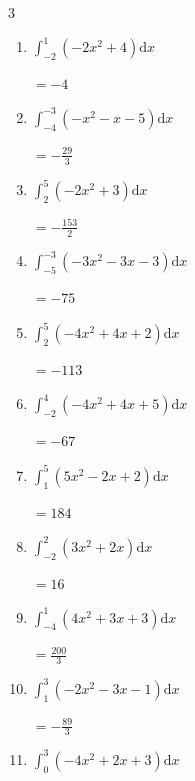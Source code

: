 \begin{multicols}{3}
\begin{enumerate}
        $\displaystyle =\frac{3}{2}$

  \item $\displaystyle \int_{-2}^{1}\left( -2x^{2}+4 \right) \mathrm{d}x$

        $\displaystyle =-4$

  \item $\displaystyle \int_{-4}^{-3}\left( -x^{2}-x-5 \right) \mathrm{d}x$

        $\displaystyle =-\frac{29}{3}$

  \item $\displaystyle \int_{2}^{5}\left( -2x^{2}+3 \right) \mathrm{d}x$

        $\displaystyle =-\frac{153}{2}$

\columnbreak %

  \item $\displaystyle \int_{-5}^{-3}\left( -3x^{2}-3x-3 \right) \mathrm{d}x$

        $\displaystyle =-75$

  \item $\displaystyle \int_{2}^{5}\left( -4x^{2}+4x+2 \right) \mathrm{d}x$

        $\displaystyle =-113$

  \item $\displaystyle \int_{-2}^{4}\left( -4x^{2}+4x+5 \right) \mathrm{d}x$

        $\displaystyle =-67$

  \item $\displaystyle \int_{1}^{5}\left( 5x^{2}-2x+2 \right) \mathrm{d}x$

        $\displaystyle =184$

  \item $\displaystyle \int_{-2}^{2}\left( 3x^{2}+2x \right) \mathrm{d}x$

        $\displaystyle =16$

\columnbreak %

  \item $\displaystyle \int_{-4}^{1}\left( 4x^{2}+3x+3 \right) \mathrm{d}x$

        $\displaystyle =\frac{200}{3}$

  \item $\displaystyle \int_{1}^{3}\left( -2x^{2}-3x-1 \right) \mathrm{d}x$

        $\displaystyle =-\frac{89}{3}$

  \item $\displaystyle \int_{0}^{3}\left( -4x^{2}+2x+3 \right) \mathrm{d}x$


\end{enumerate}
\end{multicols}
